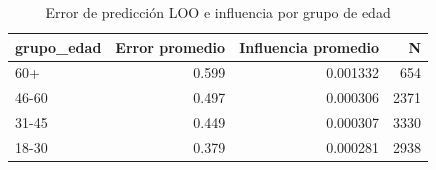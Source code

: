 \begin{table}[ht]
\centering
\begin{tabular}{lrrr}
  \toprule
grupo\_edad & Error promedio & Influencia promedio & N \\ 
  \midrule
60+ & 0.599 & 0.001332 & 654 \\ 
  46-60 & 0.497 & 0.000306 & 2371 \\ 
  31-45 & 0.449 & 0.000307 & 3330 \\ 
  18-30 & 0.379 & 0.000281 & 2938 \\ 
   \bottomrule
\end{tabular}
\caption{Error de predicción LOO e influencia por grupo de edad} 
\label{tab:edad}
\end{table}
